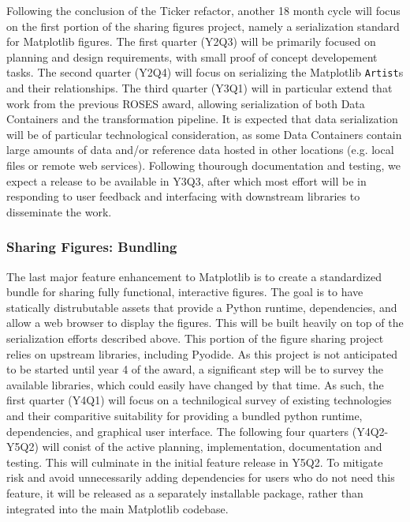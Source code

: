 \documentclass[12pt]{article}
\numberwithin{page}{section}
\begin{document}
Following the conclusion of the Ticker refactor, another 18 month cycle will focus on the first portion of the sharing figures project, namely a serialization standard for Matplotlib figures.
The first quarter (Y2Q3) will be primarily focused on planning and design requirements, with small proof of concept developement tasks.
The second quarter (Y2Q4) will focus on serializing the Matplotlib \texttt{Artist}s and their relationships.
The third quarter (Y3Q1) will in particular extend that work from the previous ROSES award, allowing serialization of both Data Containers and the transformation pipeline.
It is expected that data serialization will be of particular technological consideration, as some Data Containers contain large amounts of data and/or reference data hosted in other locations (e.g. local files or remote web services).
Following thourough documentation and testing, we expect a release to be available in Y3Q3, after which most effort will be in responding to user feedback and interfacing with downstream libraries to disseminate the work.

\subsubsection{Sharing Figures: Bundling}

The last major feature enhancement to Matplotlib is to create a standardized bundle for sharing fully functional, interactive figures.
The goal is to have statically distrubutable assets that provide a Python runtime, dependencies, and allow a web browser to display the figures.
This will be built heavily on top of the serialization efforts described above.
This portion of the figure sharing project relies on upstream libraries, including Pyodide.
As this project is not anticipated to be started until year 4 of the award, a significant step will be to survey the available libraries, which could easily have changed by that time.
As such, the first quarter (Y4Q1) will focus on a technilogical survey of existing technologies and their comparitive suitability for providing a bundled python runtime, dependencies, and graphical user interface.
The following four quarters (Y4Q2-Y5Q2) will conist of the active planning, implementation, documentation and testing.
This will culminate in the initial feature release in Y5Q2.
To mitigate risk and avoid unnecessarily adding dependencies for users who do not need this feature, it will be released as a separately installable package, rather than integrated into the main Matplotlib codebase.
\end{document}
